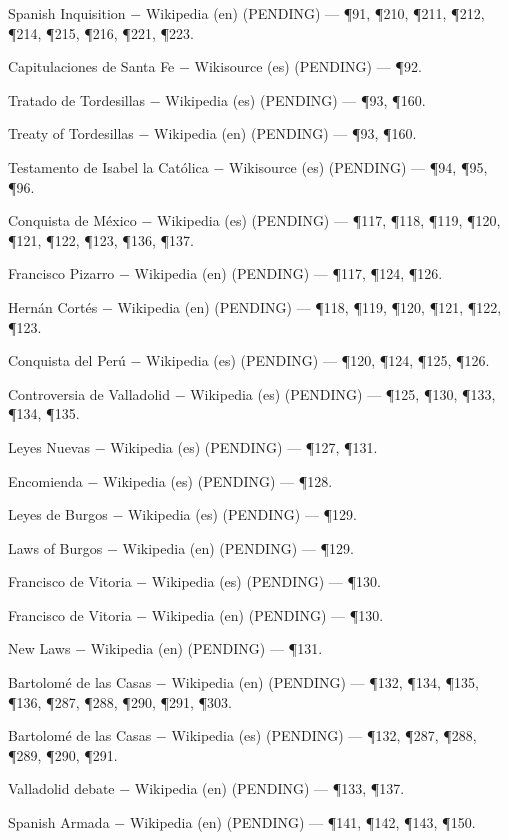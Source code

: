 \documentclass{book}
\begin{document}
\noindent Spanish Inquisition \(-\) Wikipedia (en) (PENDING) --- \P91, \P210, \P211, \P212, \P214, \P215, \P216, \P221, \P223.

\noindent Capitulaciones de Santa Fe \(-\) Wikisource (es) (PENDING) --- \P92.

\noindent Tratado de Tordesillas \(-\) Wikipedia (es) (PENDING) --- \P93, \P160.

\noindent Treaty of Tordesillas \(-\) Wikipedia (en) (PENDING) --- \P93, \P160.

\noindent Testamento de Isabel la Católica \(-\) Wikisource (es) (PENDING) --- \P94, \P95, \P96.

\noindent Conquista de México \(-\) Wikipedia (es) (PENDING) --- \P117, \P118, \P119, \P120, \P121, \P122, \P123, \P136, \P137.

\noindent Francisco Pizarro \(-\) Wikipedia (en) (PENDING) --- \P117, \P124, \P126.

\noindent Hernán Cortés \(-\) Wikipedia (en) (PENDING) --- \P118, \P119, \P120, \P121, \P122, \P123.

\noindent Conquista del Perú \(-\) Wikipedia (es) (PENDING) --- \P120, \P124, \P125, \P126.

\noindent Controversia de Valladolid \(-\) Wikipedia (es) (PENDING) --- \P125, \P130, \P133, \P134, \P135.

\noindent Leyes Nuevas \(-\) Wikipedia (es) (PENDING) --- \P127, \P131.

\noindent Encomienda \(-\) Wikipedia (es) (PENDING) --- \P128.

\noindent Leyes de Burgos \(-\) Wikipedia (es) (PENDING) --- \P129.

\noindent Laws of Burgos \(-\) Wikipedia (en) (PENDING) --- \P129.

\noindent Francisco de Vitoria \(-\) Wikipedia (es) (PENDING) --- \P130.

\noindent Francisco de Vitoria \(-\) Wikipedia (en) (PENDING) --- \P130.

\noindent New Laws \(-\) Wikipedia (en) (PENDING) --- \P131.

\noindent Bartolomé de las Casas \(-\) Wikipedia (en) (PENDING) --- \P132, \P134, \P135, \P136, \P287, \P288, \P290, \P291, \P303.

\noindent Bartolomé de las Casas \(-\) Wikipedia (es) (PENDING) --- \P132, \P287, \P288, \P289, \P290, \P291.

\noindent Valladolid debate \(-\) Wikipedia (en) (PENDING) --- \P133, \P137.

\noindent Spanish Armada \(-\) Wikipedia (en) (PENDING) --- \P141, \P142, \P143, \P150.
\end{document}
